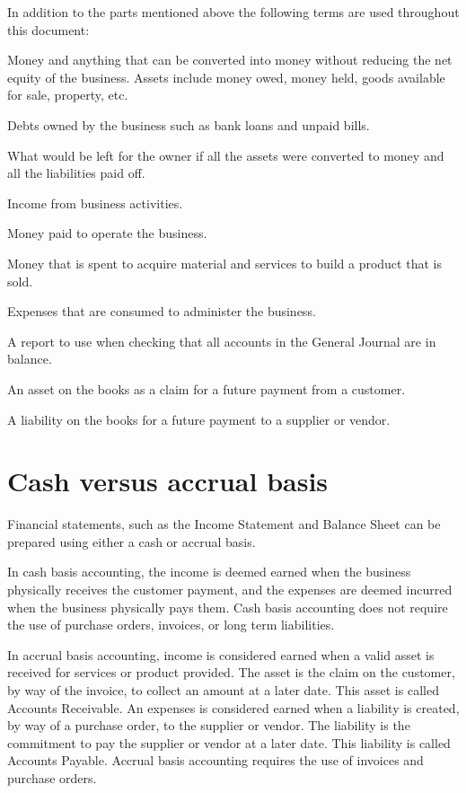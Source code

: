 In addition to the parts mentioned above the following terms are used throughout this
document:
\begin{description}[style=nextline]
        \item [Assets] Money and anything that can be converted into money without reducing
        the net equity of the business. Assets include money owed, money held, goods
        available for sale, property, etc.
        \item [Liabilities] Debts owned by the business such as bank loans and unpaid bills.
        \item [Equity] What would be left for the owner if all the assets were converted to
        money and all the liabilities paid off.
        \item [Revenue] Income from business activities.
        \item [Expense] Money paid to operate the business.
        \item [Cost of Goods] Money that is spent to acquire material and services to build a product that is sold.
        \item [Operating Expenses] Expenses that are consumed to administer the business.
        \item [Trial Balance] A report to use when checking that all accounts in the
        General Journal are in balance.
        \item [Accounts Receivable] An asset on the books as a claim for a future payment
        from a customer.
        \item [Accounts Payable] A liability on the books for a future payment to a supplier
        or vendor.
\end{description}

\section{Cash versus accrual basis}
\label{sec-accounting-cash-vs-accrual}

Financial statements, such as the Income Statement and Balance Sheet can be prepared using
either a cash or accrual basis.

In \gls{cash basis} accounting, the income is deemed earned when the business physically
receives the customer payment, and the expenses are deemed incurred when the business
physically pays them. Cash basis accounting does not require the use of purchase orders,
invoices, or long term liabilities.

In \gls{accrual basis} accounting, income is considered earned when a valid asset is
received for services or product provided. The asset is the claim on the customer,
by way of the invoice, to collect an amount at a later date. This asset is called
Accounts Receivable. An expenses is considered earned when a liability is created,
by way of a purchase order, to the supplier or vendor. The liability is the commitment
to pay the supplier or vendor at a later date. This liability is called Accounts Payable.
Accrual basis accounting requires the use of invoices and purchase orders.

